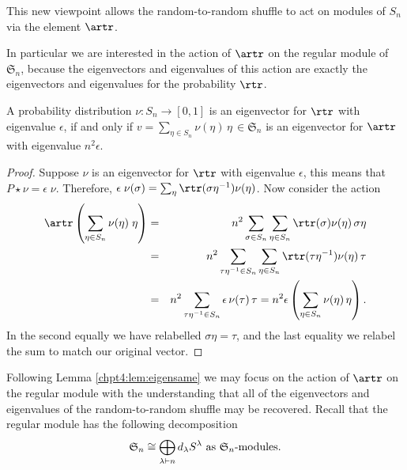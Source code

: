 \documentclass[11pt]{report}
\begin{document}
This new viewpoint allows the random-to-random shuffle to act on modules of $S_{n}$ via the element $\artr$.


In particular we are interested in the action of $\artr$ on the regular module of $\mathfrak{S}_{n}$, because the eigenvectors and eigenvalues of this action are exactly the eigenvectors and eigenvalues for the probability $\rtr$.



\begin{lemma}
	\label{chpt4:lem:eigensame}
	A probability distribution $\nu:S_{n} \to [0,1]$ is an eigenvector for $\rtr$ with eigenvalue 
	$\epsilon$, if and only if $v = \sum_{\eta \in S_{n}} \nu(\eta) \, \eta  \, \in \mathfrak{S}_{n}$ is an eigenvector for $\artr$ with 
	eigenvalue $n^{2} \epsilon$.
\end{lemma} 

\begin{proof}
	Suppose $\nu$ is an eigenvector for $\rtr$ with eigenvalue $\epsilon$, this means that $P \star \nu  = \epsilon \; \nu$. Therefore, $\epsilon 
	\; \nu(\sigma) = \sum_{\eta} \rtr(\sigma \eta^{-1}) \nu(\eta)$.
	Now consider the action 
	\begin{eqnarray*}
		\artr \left( \sum_{\eta \in S_{n}} \nu(\eta)  \; 
		\eta\right) & = & n^{2}\sum_{\sigma \in S_{n}} \sum_{\eta\in S_{n}}  
		\rtr(\sigma) \nu(\eta) \, \sigma \eta\\ 
		& = &n^{2}\sum_{\tau\eta^{-1} \in 
			S_{n}} \sum_{\eta \in S_{n}}  \rtr(\tau \eta^{-1}) \nu(\eta) \, 
		\tau\\
		& = & 
		n^{2} \sum_{\tau \eta^{-1} \in S_{n}} \epsilon \, \nu(\tau) \, \tau = 
		n^{2}\epsilon \left(\sum_{\eta \in S_{n}} 
		\nu(\eta) \, \eta \right) .
	\end{eqnarray*}
	In the second equally we have relabelled $\sigma \eta = \tau$, and 
	the last equality we relabel the sum to match our original vector.
\end{proof}

Following Lemma \ref{chpt4:lem:eigensame} we may focus on the action of 
$\artr$ on the regular module with the understanding that all of the eigenvectors and eigenvalues of the random-to-random shuffle may be recovered. Recall that the regular module has the following decomposition
\begin{eqnarray}
\mathfrak{S}_{n} \cong \bigoplus_{\lambda \vdash n} d_{\lambda} 
S^{\lambda} \textnormal{ as $\mathfrak{S}_{n}$-modules}. \label{chpt4:eqn:spechtdecomp}
\end{eqnarray}
\end{document}

